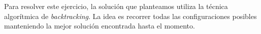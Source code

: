 
Para resolver este ejercicio, la soluci\'on que planteamos utiliza la t\'ecnica algor\'itmica de \textit{backtracking}. La idea es recorrer todas las configuraciones posibles manteniendo la mejor soluci\'on encontrada hasta el momento.\\

 